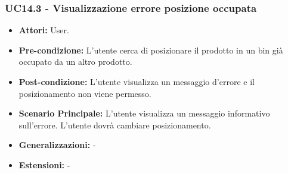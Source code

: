 \subsubsection{UC14.3 - Visualizzazione errore posizione occupata}
\begin{itemize}
    \item \textbf{Attori:} User.
    \item \textbf{Pre-condizione:}  L'utente cerca di posizionare il prodotto in un bin già occupato da un altro prodotto.
    \item \textbf{Post-condizione:} L'utente visualizza un messaggio d'errore e il posizionamento non viene permesso.
    \item \textbf{Scenario Principale:} L'utente visualizza un messaggio informativo sull'errore. L'utente dovrà cambiare posizionamento.
    \item \textbf{Generalizzazioni:} -
    \item \textbf{Estensioni:} -
\end{itemize}